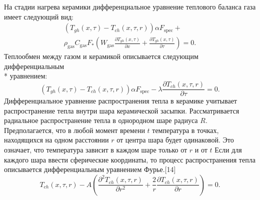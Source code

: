 \documentclass[a4paper,12pt]{article}
\begin{document}
На стадии нагрева керамики дифференциальное уравнение теплового баланса
газа имеет следующий вид:
\begin{equation}
    \begin{array}{ll}
        \left( T_{gh}(x,\tau) - T_{ch}(x,\tau,r) \right) \alpha F_{\text{spec}}+\\
        \rho_{\text{gas}} C_{\text{gas}} F_{*}
        \left( W_{\text{gas}} \frac{\partial T_{gh} (x, \tau)}{\partial x} + 
        \frac{\partial T_{gh} (x, \tau)}{\partial \tau} \right) = 0.
    \end{array}
    \label{gasheat}
\end{equation}
Теплообмен между газом и керамикой описывается следующим дифференциальным
\\* уравнением: 
\begin{equation}
    \left( T_{gh}(x,\tau) - T_{ch}(x,\tau,r) \right) \alpha F_{\text{spec}}-
    \lambda \frac{\partial T_{ch} (x, \tau, r)}{\partial \tau} = 0.
    \label{surfheat}
\end{equation}
Дифференциальное уравнение распространения тепла в керамике учитывает
распространение тепла внутри шара керамической засыпки. Рассматривается
радиальное распространение тепла в однородном шаре радиуса $R$.
Предполагается, что в любой момент времени $t$ температура в точках,
находящихся на одном расстоянии $r$ от центра шара будет одинаковой. Это
означает, что температура зависит в каждом шаре только от $r$ и от $t$ Если
для каждого шара ввести сферические координаты, то процесс распространения
тепла описывается дифференциальным уравнением Фурье.[14]
\begin{equation}
    T_{ch}(x,\tau,r) - A \left( 
    \frac{ \partial^2 T_{ch}(x,\tau,r)}{\partial r^2} +
    \frac{2}{r} \frac{ \partial T_{ch}(x,\tau,r)}{\partial r} \right) = 0.
    \label{cerheat}
\end{equation}
\end{document}
